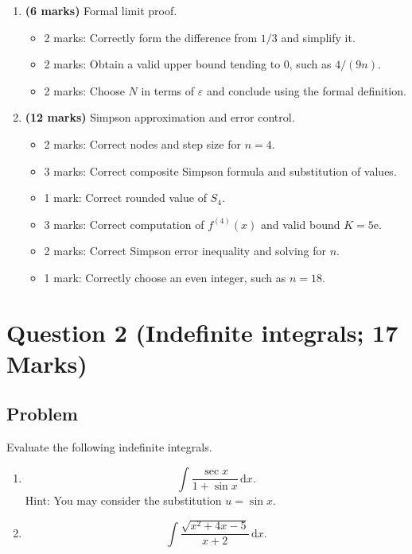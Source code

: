 \documentclass[12pt]{article}
\newcommand{\dd}{\,\mathrm{d}}
\newcommand{\ee}{\mathrm{e}}
\begin{document}
\begin{enumerate}[label=(\alph*)]
\item \textbf{(6 marks)} Formal limit proof.
\begin{itemize}
\item 2 marks: Correctly form the difference from $1/3$ and simplify it.
\item 2 marks: Obtain a valid upper bound tending to $0$, such as $4/(9n)$.
\item 2 marks: Choose $N$ in terms of $\varepsilon$ and conclude using the formal definition.
\end{itemize}

\item \textbf{(12 marks)} Simpson approximation and error control.
\begin{itemize}
\item 2 marks: Correct nodes and step size for $n=4$.
\item 3 marks: Correct composite Simpson formula and substitution of values.
\item 1 mark: Correct rounded value of $S_4$.
\item 3 marks: Correct computation of $f^{(4)}(x)$ and valid bound $K=5\ee$.
\item 2 marks: Correct Simpson error inequality and solving for $n$.
\item 1 mark: Correctly choose an even integer, such as $n=18$.
\end{itemize}
\end{enumerate}

\newpage
\section{Question 2 (Indefinite integrals; 17 Marks)}

\subsection{Problem}

Evaluate the following indefinite integrals.
\begin{enumerate}[label=(\alph*)]
\item
\[
\int \frac{\sec x}{1+\sin x}\dd x.
\]
Hint: You may consider the substitution $u=\sin x$.

\item
\[
\int \frac{\sqrt{x^2+4x-5}}{x+2}\dd x.
\]
\end{enumerate}
\end{document}
